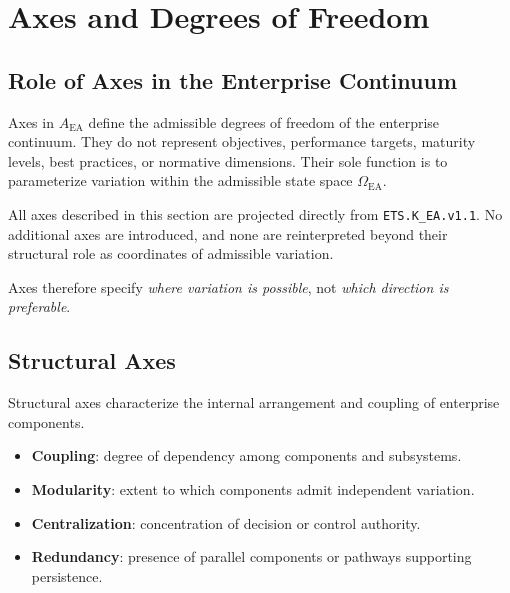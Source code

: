 
\section{Axes and Degrees of Freedom}

\subsection{Role of Axes in the Enterprise Continuum}

Axes in $A_{\mathrm{EA}}$ define the admissible degrees of freedom of the
enterprise continuum.
They do not represent objectives, performance targets, maturity levels,
best practices, or normative dimensions.
Their sole function is to parameterize variation within the admissible
state space $\Omega_{\mathrm{EA}}$.

All axes described in this section are projected directly from
\texttt{ETS.K\_EA.v1.1}.
No additional axes are introduced, and none are reinterpreted beyond
their structural role as coordinates of admissible variation.

Axes therefore specify \emph{where variation is possible}, not
\emph{which direction is preferable}.

\subsection{Structural Axes}

Structural axes characterize the internal arrangement and coupling of
enterprise components.

\begin{itemize}
  \item \textbf{Coupling}: degree of dependency among components and
        subsystems.
  \item \textbf{Modularity}: extent to which components admit independent
        variation.
  \item \textbf{Centralization}: concentration of decision or control
        authority.
  \item \textbf{Redundancy}: presence of parallel components or pathways
        supporting persistence.
\end{itemize}

